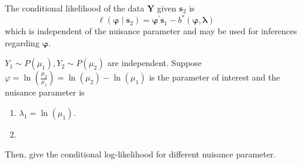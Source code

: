 The conditional likelihood of the data $\mathbf{Y}$ given $\mathbf{s}_{2}$ is
\begin{equation}
	\ell\left(\boldsymbol{\varphi}\mid\mathbf{s}_{2}\right)=\boldsymbol{\varphi}^{\prime}\mathbf{s}_{1}-b^{*}\left(\boldsymbol{\varphi},\boldsymbol{\lambda}\right)
\end{equation}
which is independent of the nuisance parameter and may be used for inferences regarding $\boldsymbol{\varphi}$.

\begin{example}
	$Y_{1}\sim P\left(\mu_{1}\right),Y_{2}\sim P\left(\mu_{2}\right)$ are independent. Suppose $\varphi=\ln\left(\frac{\mu_{2}}{\mu_{1}}\right)=\ln\left(\mu_{2}\right)-\ln\left(\mu_{1}\right)$ is the parameter of interest and the nuisance parameter is
	\begin{enumerate}
		\item $\lambda_{1}=\ln\left(\mu_{1}\right)$.
		\item
	\end{enumerate}
	Then, give the conditional log-likelihood for different nuisance parameter.
\end{example}

